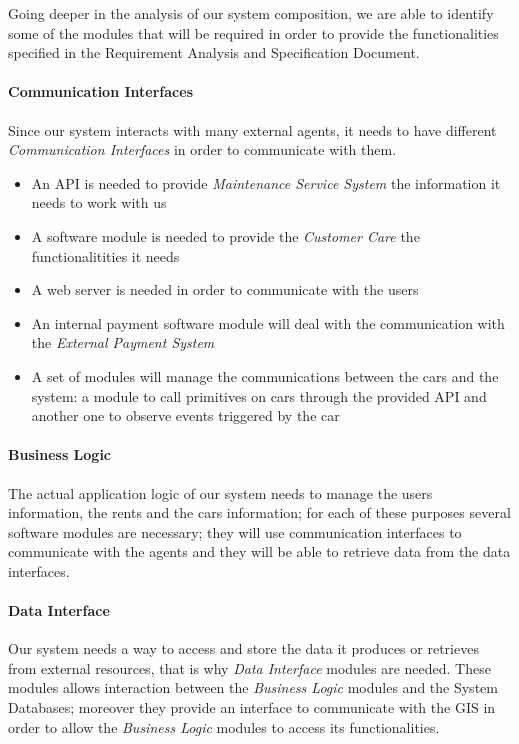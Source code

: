 		Going deeper in the analysis of our system composition, we are able to identify some of the modules that will be required in order to provide the functionalities specified in the Requirement Analysis and Specification Document. 
		\paragraph{Communication Interfaces}
			Since our system interacts with many external agents, it needs to have different \emph{Communication Interfaces} in order to communicate with them. 
		\begin{itemize}
			\item An API is needed to provide \emph{Maintenance Service System} the information it needs to work with us
			\item A software module is needed to provide the \emph{Customer Care} the functionalitities it needs
			\item A web server is needed in order to communicate with the users
			\item An internal payment software module will deal with the communication with the \emph{External Payment System} 
			\item A set of modules will manage the communications between the cars and the system: a module to call primitives on cars through the provided API and another one to observe events triggered by the car 
		\end{itemize}
		\paragraph{Business Logic}
			The actual application logic of our system needs to manage the users information, the rents and the cars information; for each of these purposes several software modules are necessary; they will use communication interfaces to communicate with the agents and they will be able to retrieve data from the data interfaces.
		\paragraph{Data Interface}
			Our system needs a way to access and store the data it produces or retrieves from external resources, that is why \emph{Data Interface} modules are needed. These modules allows interaction between the \emph{Business Logic} modules and the System Databases; moreover they provide an interface to communicate with the GIS in order to allow the \emph{Business Logic} modules to access its functionalities.

